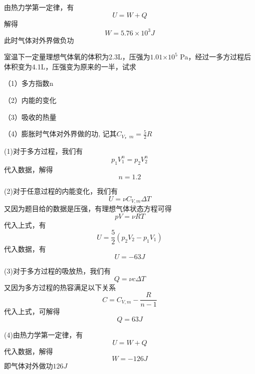 \documentclass[lang=cn,10pt]{elegantbook}
\begin{document}
\begin{solution}
		由热力学第一定律，有
		\begin{equation*}
			U=W+Q
		\end{equation*}
		解得
		\begin{equation*}
			W=5.76\times10^{3}J 
		\end{equation*}
		此时气体对外界做负功
	\end{solution}
	
	\begin{example}
		室温下一定量理想气体氧的体积为2.3L，压强为$1.01$$\times$$10^{5}$  Pa，经过一多方过程后体积变为4.1L，压强变为原来的一半，试求
		
		（1）多方指数n
		
		（2）内能的变化
		
		（3）吸收的热量
		
		（4）膨胀时气体对外界做的功,
		记其$C_{V，m}=\frac{5}{2}R$
	\end{example}
	\begin{solution}
		(1)对于多方过程，我们有
		\begin{equation*}
			p_1V_{1}^{n}=p_2V_{2}^{n}
		\end{equation*}
		代入数据，解得
		\begin{equation*}
			n=1.2
		\end{equation*}
		
		(2)对于任意过程的内能变化，我们有
		\begin{equation*}
			U=\nu C_{V,m}\varDelta T
		\end{equation*}
		又因为题目给的数据是压强，有理想气体状态方程可得
		\begin{equation*}
			pV=\nu RT
		\end{equation*}
		代入上式，有
		\begin{equation*}
			U=\frac{5}{2}(p_{2}V_{2}-p_{1}V_{1}) 
		\end{equation*}
		代入数据，有
		\begin{equation*}
			U=-63J
		\end{equation*}
		
		(3)对于多方过程的吸放热，我们有
		\begin{equation*}
			Q=\nu c\varDelta T
		\end{equation*}
		又因为多方过程的热容满足以下关系
		\begin{equation*}
			C=C_{V,m}-\frac{R}{n-1}
		\end{equation*}
		代入上式，可解得
		\begin{equation*}
			Q=63J
		\end{equation*}
		
		(4)由热力学第一定律，有
		\begin{equation*}
			U=W+Q
		\end{equation*}
		代入数据，解得
		\begin{equation*}
			W=-126J
		\end{equation*}
		即气体对外做功$126J$
	\end{solution}
\end{document}
